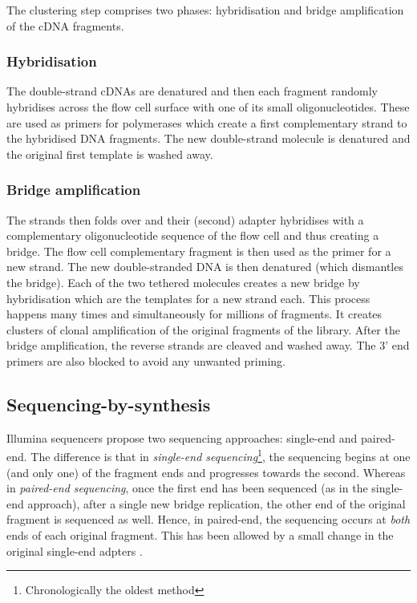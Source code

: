 The clustering step comprises two phases: hybridisation and bridge amplification
of the \gls{cDNA} fragments.

\subsubsection{Hybridisation}

The double-strand \glspl{cDNA} are denatured and then each fragment randomly
hybridises across the flow cell surface with one of its small oligonucleotides.
These are used as primers for polymerases which create a first complementary
strand to the hybridised \gls{DNA} fragments. The new double-strand molecule is
denatured and the original first template is washed away.

\subsubsection{Bridge amplification}
The strands then folds over and their (second) adapter hybridises with a
complementary oligonucleotide sequence of the flow cell and thus creating a
bridge. The flow cell complementary fragment is then used as the primer for a new
strand. The new double-stranded \gls{DNA} is then denatured (which
dismantles the bridge). Each of the two tethered molecules creates a new
bridge by hybridisation which are the templates for a new strand each.
This process happens many times and simultaneously for millions of fragments.
It creates clusters of clonal amplification of the original fragments of
the library. After the bridge amplification, the reverse strands are cleaved
and washed away. The 3' end primers are also blocked to avoid any unwanted
priming.

\subsection{Sequencing-by-synthesis}
\label{subsub:sequencing}

Illumina sequencers propose two sequencing approaches: single-end and paired-end.
The difference is that in \emph{single-end sequencing}\footnote{Chronologically
the oldest method}, the sequencing begins at one (and only one) of the fragment
ends and progresses towards the second. Whereas in \emph{paired-end sequencing},
once the first end has been sequenced (as in the single-end approach), after a
single new bridge replication, the other end of the original fragment is
sequenced as well. Hence, in paired-end, the sequencing occurs at \emph{both}
ends of each original fragment. This has been allowed by a small change in
the original single-end adpters .

